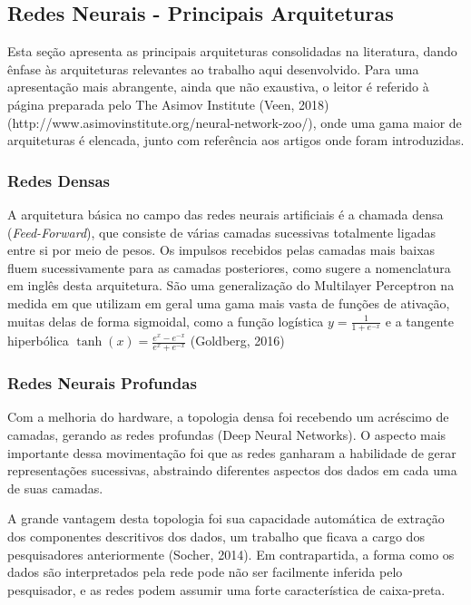 \documentclass[]{article}
\begin{document}
\hypertarget{redes-neurais---principais-arquiteturas}{%
\subsection{Redes Neurais - Principais
Arquiteturas}\label{redes-neurais---principais-arquiteturas}}

Esta seção apresenta as principais arquiteturas consolidadas na
literatura, dando ênfase às arquiteturas relevantes ao trabalho aqui
desenvolvido. Para uma apresentação mais abrangente, ainda que não
exaustiva, o leitor é referido à página preparada pelo The Asimov
Institute (Veen,
2018)(http://www.asimovinstitute.org/neural-network-zoo/), onde uma gama
maior de arquiteturas é elencada, junto com referência aos artigos onde
foram introduzidas.

\hypertarget{redes-densas}{%
\subsubsection{Redes Densas}\label{redes-densas}}

A arquitetura básica no campo das redes neurais artificiais é a chamada
densa (\emph{Feed-Forward}), que consiste de várias camadas sucessivas
totalmente ligadas entre si por meio de pesos. Os impulsos recebidos
pelas camadas mais baixas fluem sucessivamente para as camadas
posteriores, como sugere a nomenclatura em inglês desta arquitetura. São
uma generalização do Multilayer Perceptron na medida em que utilizam em
geral uma gama mais vasta de funções de ativação, muitas delas de forma
sigmoidal, como a função logística \(y = \frac{1}{1 + e ^ {-x}}\) e a
tangente hiperbólica \(\tanh(x) = \frac{e^x − e^{-x}}{e^x + e^{-x}}\)
(Goldberg, 2016)

\hypertarget{redes-neurais-profundas}{%
\subsubsection{Redes Neurais Profundas}\label{redes-neurais-profundas}}

Com a melhoria do hardware, a topologia densa foi recebendo um acréscimo
de camadas, gerando as redes profundas (Deep Neural Networks). O aspecto
mais importante dessa movimentação foi que as redes ganharam a
habilidade de gerar representações sucessivas, abstraindo diferentes
aspectos dos dados em cada uma de suas camadas.

A grande vantagem desta topologia foi sua capacidade automática de
extração dos componentes descritivos dos dados, um trabalho que ficava a
cargo dos pesquisadores anteriormente (Socher, 2014). Em contrapartida,
a forma como os dados são interpretados pela rede pode não ser
facilmente inferida pelo pesquisador, e as redes podem assumir uma forte
característica de caixa-preta.
\end{document}
